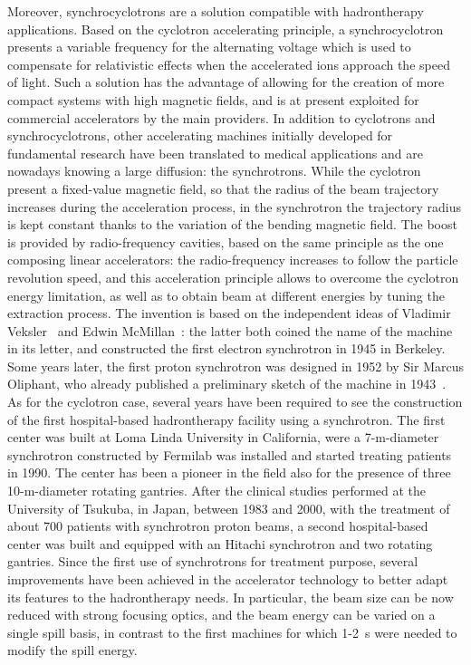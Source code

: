 Moreover, synchrocyclotrons are a solution compatible with hadrontherapy applications. Based on the cyclotron accelerating principle, a synchrocyclotron presents a variable frequency for the alternating voltage which is used to compensate for relativistic effects when the accelerated ions approach the speed of light. Such a solution has the advantage of allowing for the creation of more compact systems with high magnetic fields, and is at present exploited for commercial accelerators by the main providers.  
In addition to cyclotrons and synchrocyclotrons, other accelerating machines  initially developed for fundamental research have been translated to medical applications and are nowadays knowing a large diffusion: the synchrotrons. While the cyclotron present a fixed-value magnetic field, so that the radius of the beam trajectory increases during the acceleration process, in the synchrotron the trajectory radius is kept constant thanks to the variation of the bending magnetic field. The boost is provided by radio-frequency cavities, based on the same principle as the one composing linear accelerators: the radio-frequency increases to follow the particle revolution speed, and this acceleration principle allows to overcome the cyclotron energy limitation, as well as to obtain beam at different energies by tuning the extraction process. The invention is based on the independent ideas of Vladimir Veksler~\parencite{Veksler1944} and Edwin McMillan~\parencite{McMillan1945}: the latter both coined the name of the machine in its letter, and constructed the first electron synchrotron in 1945 in Berkeley. Some years later, the first proton synchrotron was designed in 1952 by Sir Marcus Oliphant, who already published a preliminary sketch of the machine in 1943~\parencite{Oliphant1943}. As for the cyclotron case, several years have been required to see the construction of the first hospital-based hadrontherapy facility using a synchrotron. The first center was built at Loma Linda University in California, were a 7-m-diameter synchrotron constructed by Fermilab was installed and started treating patients in 1990. The center has been a pioneer in the field also for the presence of three 10-m-diameter rotating gantries.  
After the clinical studies performed at the University of Tsukuba, in Japan, between 1983 and 2000, with the treatment of about 700 patients with synchrotron proton beams, a second hospital-based center was built and equipped with an Hitachi synchrotron and two rotating gantries. 
Since the first use of synchrotrons for treatment purpose, several improvements have been achieved in the accelerator technology to better adapt its features to the hadrontherapy needs. In particular, the beam size can be now reduced with strong focusing optics, and the beam energy can be varied on a single spill basis, in contrast to the first machines for which 1-2~s were needed to modify the spill energy.   

